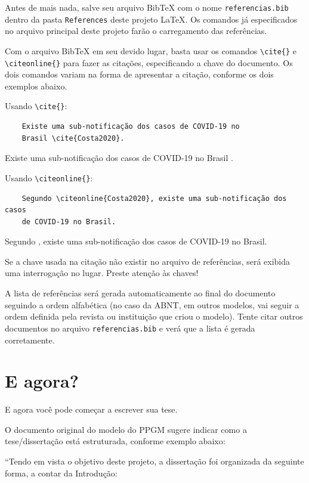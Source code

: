 Antes de mais nada, salve seu arquivo BibTeX com o nome \verb=referencias.bib= dentro da pasta \verb=References= deste projeto \LaTeX. Os comandos já especificados no arquivo principal deste projeto farão o carregamento das referências.

Com o arquivo BibTeX em seu devido lugar, basta usar os comandos \verb=\cite{}= e \verb=\citeonline{}= para fazer as citações, especificando a chave do documento. Os dois comandos variam na forma de apresentar a citação, conforme os dois exemplos abaixo.

Usando \verb=\cite{}=:

\begin{verbatim}
    Existe uma sub-notificação dos casos de COVID-19 no
    Brasil \cite{Costa2020}.
\end{verbatim}

Existe uma sub-notificação dos casos de COVID-19 no Brasil \cite{Costa2020}.

Usando \verb=\citeonline{}=:

\begin{verbatim}
    Segundo \citeonline{Costa2020}, existe uma sub-notificação dos casos
    de COVID-19 no Brasil.
\end{verbatim}

Segundo , existe uma sub-notificação dos casos de COVID-19 no Brasil.

Se a chave usada na citação não existir no arquivo de referências, será exibida uma interrogação no lugar. Preste atenção às chaves!

A lista de referências será gerada automaticamente ao final do documento seguindo a ordem alfabética (no caso da ABNT, em outros modelos, vai seguir a ordem definida pela revista ou instituição que criou o modelo). Tente citar outros documentos no arquivo \verb=referencias.bib= e verá que a lista é gerada corretamente.

\section{E agora?}
\label{sec:e_agora}

E agora você pode começar a escrever sua tese.

O documento original do modelo do PPGM sugere indicar como a tese/dissertação está estruturada, conforme exemplo abaixo:

``Tendo em vista o objetivo deste projeto, a dissertação foi organizada da seguinte forma, a contar da Introdução:

